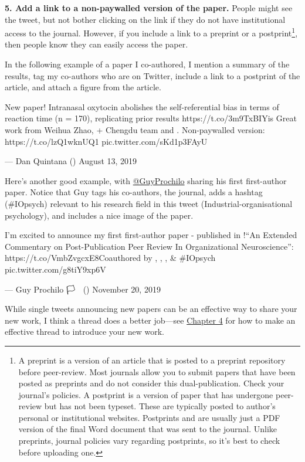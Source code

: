 \documentclass[]{book}
\let\rmarkdownfootnote\footnote%
\def\footnote{\protect\rmarkdownfootnote}
\begin{document}
\textbf{5. Add a link to a non-paywalled version of the paper.} People might see the tweet, but not bother clicking on the link if they do not have institutional access to the journal. However, if you include a link to a preprint or a postprint\footnote{A preprint is a version of an article that is posted to a preprint repository before peer-review. Most journals allow you to submit papers that have been posted as preprints and do not consider this dual-publication. Check your journal's policies. A postprint is a version of paper that has undergone peer-review but has not been typeset. These are typically posted to author's personal or institutional websites. Postprints and are usually just a PDF version of the final Word document that was sent to the journal. Unlike preprints, journal policies vary regarding postprints, so it's best to check before uploading one.}, then people know they can easily access the paper.

In the following example of a paper I co-authored, I mention a summary of the results, tag my co-authors who are on Twitter, include a link to a postprint of the article, and attach a figure from the article.

New paper! Intranasal oxytocin abolishes the self-referential bias in terms of reaction time (n = 170), replicating prior results https://t.co/3m9TxBIYis Great work from Weihua Zhao, \citet{bn_becker} + Chengdu team and \citet{ChrisMontag77}. Non-paywalled version: https://t.co/lzQ1wknUQ1 pic.twitter.com/sKd1p3FAyU

--- Dan Quintana (\citet{dsquintana}) August 13, 2019

Here's another good example, with \href{https://twitter.com/GuyProchilo}{@GuyProchilo} sharing his first first-author paper. Notice that Guy tags his co-authors, the journal, adds a hashtag (\#IOpsych) relevant to his research field in this tweet (Industrial-organisational psychology), and includes a nice image of the paper.

I'm excited to announce my first first-author paper - published in \citet{Meta_Psy}!``An Extended Commentary on Post-Publication Peer Review In Organizational Neuroscience'': https://t.co/VmbZvgcxE8Coauthored by \citet{WLouisUQ}, \citet{DLabMelbourne}, \citet{HannesZacher}, \& \citet{Social_Neuro_M}\#IOpsych pic.twitter.com/g8tiY9xp6V

--- Guy Prochilo 🏳️
🌈 (\citet{GuyProchilo}) November 20, 2019

While single tweets announcing new papers can be an effective way to share your new work, I think a thread does a better job---see \protect\hyperlink{advanced-twitter-skills}{Chapter 4} for how to make an effective thread to introduce your new work.
\end{document}
